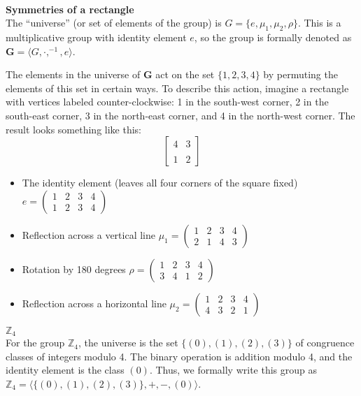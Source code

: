 \documentclass[12pt,reqno]{amsart}
\newcommand{\Z}{\ensuremath{\mathbb{Z}}}
\newcommand{\bG}{\ensuremath{\mathbf{G}}}
\newcommand{\<}{\ensuremath{\langle}}
\renewcommand{\>}{\ensuremath{\rangle}}
\begin{document}
\begin{enumerate}
 
\medskip

\\[4pt]
{\bf Symmetries of a rectangle}\\
The ``universe'' (or set of elements of the group) is 
$G = \{e, \mu_1, \mu_2, \rho\}$.  This is a multiplicative group with identity
element $e$, so the group is formally denoted as $\bG= \<G, \cdot, ^{-1}, e\>$.

The elements in the universe of $\bG$ act on the set $\{1, 2, 3, 4\}$
by permuting the elements of this set in certain ways. To describe this action, imagine a
rectangle with vertices labeled counter-clockwise: 1 in the south-west corner,
2 in the south-east corner, 3 in the north-east corner, and 4 in the north-west
corner. The result looks something like this: 
\[
\begin{bmatrix} 4 & 3 \\
&\\
 1 & 2 \end{bmatrix}
\]

\begin{itemize}
\item 
The identity element (leaves all four corners of the square fixed)
$e = \begin{pmatrix} 1 & 2 & 3 & 4\\ 1 & 2 & 3 & 4 \end{pmatrix}$

\item Reflection across a vertical line
$\mu_1 = \begin{pmatrix}1 & 2 & 3 &4\\2 & 1 & 4 &3\end{pmatrix}$

\item Rotation by 180 degrees
$\rho = \begin{pmatrix}1 & 2 & 3 &4\\3 & 4 & 1 &2\end{pmatrix}$

\item Reflection across a horizontal line
$\mu_2 = \begin{pmatrix}1 & 2 & 3 &4\\4 & 3 & 2 &1\end{pmatrix}$
\end{itemize}


 $\Z_4$\\
For the group $\Z_4$, the universe is the set
$\{(0), (1), (2), (3)\}$  of congruence classes of integers modulo 4.  The
binary operation is addition modulo 4, and the identity element is the class $(0)$.
Thus, we formally write this group as $\Z_4 = \<\{(0), (1), (2), (3)\}, +, -, (0)\>$.


\end{enumerate}
\end{document}
